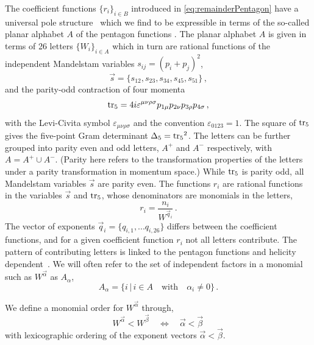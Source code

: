 The coefficient functions $\{r_i\}_{i\in B}$ introduced in
\cref{eq:remainderPentagon}  have a universal pole 
structure~\cite{Abreu:2018zmy} which we find to be expressible in terms of
the so-called planar alphabet $A$ of the pentagon functions \cite{Gehrmann:2018yef}.
The planar alphabet $A$ is given in terms
of 26 letters $\{W_i\}_{i\in A}$ which in turn are rational functions of the independent 
Mandelstam variables $s_{ij}=(p_{i}+p_j)^2$, 
\begin{equation}\label{eq:mandelstams}
\vec s=\{s_{12},s_{23},s_{34},s_{45},s_{51}\}\,,
\end{equation}
and the parity-odd contraction of four 
momenta 
\begin{equation}\label{eq:tr5Def}
\operatorname{tr_5}= 4 i \varepsilon^{\mu\nu\rho\sigma}
p_{1\mu} p_{2\nu} p_{3\rho} p_{4\sigma}\, ,
\end{equation}
with the Levi-Civita symbol $\varepsilon_{\mu\nu\rho\sigma}$ and the convention $\varepsilon_{0123}=1$. 
The square of $\operatorname{tr_5}$ gives the 
five-point Gram determinant $\Delta_5=\operatorname{tr_5}^2$.
The letters can be further grouped into parity even and odd letters, 
$A^+$ and $A^-$ respectively, with $A=A^+\cup A^-$. (Parity here refers to  
the transformation properties of the letters under a parity transformation in 
momentum space.)
While $\operatorname{tr_5}$ is parity odd, all Mandelstam variables $\vec s$ are parity even. 
The functions $r_i$ are rational functions in the variables ${\vec s}$ and $\operatorname{tr_5}$,  
whose denominators are monomials in the letters,
\begin{equation}
    r_i = \frac{n_{i}}{ W^{\vec q_i}}\,.
    \label{eq:letterDecomposition}
\end{equation}
The vector of exponents $\vec q_i=\{q_{i,1}, ... q_{i,26}\}$ 
differs between the coefficient functions, and for a given
coefficient function $r_i$ not all letters contribute. The pattern of
contributing letters is linked to the pentagon functions and helicity
dependent~\cite{Abreu:2018zmy}. 
We will often refer to the set of 
independent factors in a monomial such as $W^{\vec\alpha}$ as $A_\alpha$,
\begin{equation}\label{eq:A_alp}
		A_\alpha = \{ i\,|\, i \in A \quad \mbox{with} \quad \alpha_i\neq 0 \} \,.
\end{equation}

We define a monomial order for $W^{\vec\alpha}$ through,
\begin{equation}
  \label{eq:orderingNotation}
  W^{\vec\alpha} < W^{\vec\beta}  \quad \Leftrightarrow \quad \vec\alpha < \vec\beta \,
\end{equation}
with lexicographic ordering of the exponent vectors $\vec\alpha < \vec\beta$.

